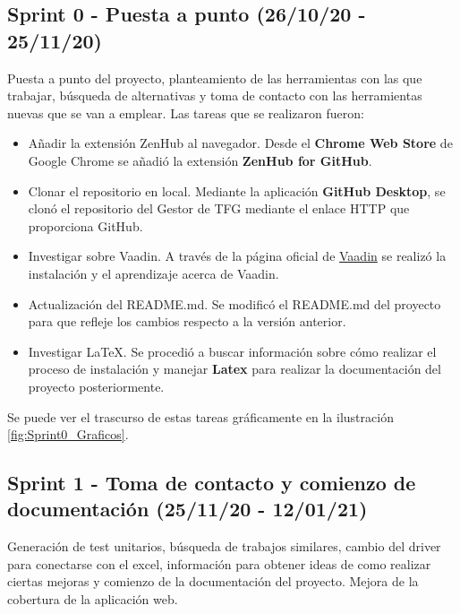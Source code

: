 \subsection{Sprint 0 - Puesta a punto (26/10/20 - 25/11/20)}
Puesta a punto del proyecto, planteamiento de las herramientas con las que trabajar, búsqueda de alternativas y toma de contacto con las herramientas nuevas que se van a emplear.
Las tareas que se realizaron fueron:
\begin{itemize}
	\tightlist
	\item Añadir la extensión ZenHub al navegador. 
		Desde el \textbf{Chrome Web Store} de Google Chrome se añadió la extensión \textbf{ZenHub for GitHub}.
	\item Clonar el repositorio en local.  
		Mediante la aplicación \textbf{GitHub Desktop}, se clonó el repositorio del Gestor de TFG mediante el enlace HTTP que proporciona GitHub.
	\item Investigar sobre Vaadin.
		A través de la página oficial de \href{https://vaadin.com/}{Vaadin} se realizó la instalación y el aprendizaje acerca de Vaadin.
	\item Actualización del README.md. 
		Se modificó el README.md del proyecto para que refleje los cambios respecto a la versión anterior. 
	\item Investigar LaTeX. 
		Se procedió a buscar información sobre cómo realizar el proceso de instalación y manejar \textbf{Latex} para realizar la documentación del proyecto posteriormente.
\end{itemize}

Se puede ver el trascurso de estas tareas gráficamente en la ilustración \ref{fig:Sprint0_Graficos}.


\subsection{Sprint 1 - Toma de contacto y comienzo de documentación (25/11/20 - 12/01/21)}
Generación de test unitarios, búsqueda de trabajos similares, cambio del driver para conectarse con el excel, información para obtener ideas de como realizar ciertas mejoras y comienzo de la documentación del proyecto. Mejora de la cobertura de la aplicación web.

